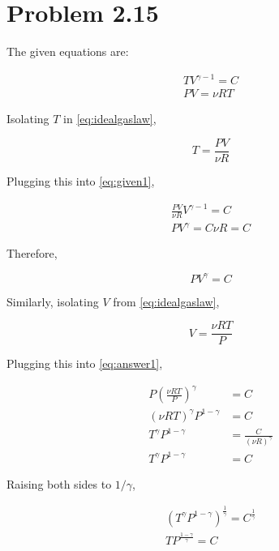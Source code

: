 \documentclass[12pt,a4paper]{article}
\begin{document}
\setcounter{page}{1}

\section*{Problem 2.15}
\bigskip

The given equations are:

\begin{eqnarray}
	TV^{\gamma-1} = C \label{eq:given1} \\
	PV = \nu RT \label{eq:idealgaslaw}
\end{eqnarray}

Isolating $T$ in \eqref{eq:idealgaslaw},

\begin{equation}
	T = \frac{PV}{\nu R} \label{eq:idealgastemp}
\end{equation}

Plugging this into \eqref{eq:given1},

\begin{align}
	\frac{PV}{\nu R} V^{\gamma - 1} = C \nonumber \\
	PV^{\gamma} = C\nu R = C
\end{align}

Therefore,

\begin{equation}\label{eq:answer1}
\boxed{	PV^\gamma = C	}
\end{equation}

Similarly, isolating $V$ from \eqref{eq:idealgaslaw},

\begin{equation}\label{eq:idealgasvol}
	V = \frac{\nu RT}{P}
\end{equation}

Plugging this into \eqref{eq:answer1},

\begin{align}
	P\left( \frac{\nu RT}{P} \right)^\gamma & = C \nonumber \\
	\left( \nu RT \right)^\gamma P^{1-\gamma} & = C \nonumber \\
	T^\gamma P^{1-\gamma} & = \frac{C}{\left( \nu R \right)^\gamma} \nonumber \\
	T^\gamma P^{1-\gamma} & = C
\end{align}

Raising both sides to $1/\gamma$,

\begin{eqnarray}
	\left( T^\gamma P^{1-\gamma} \right)^{\frac{1}{\gamma}} = C^{\frac{1}{\gamma}} \nonumber \\
\boxed{	TP^{\frac{1 - \gamma}{\gamma}} = C} \label{eq:answer2}
\end{eqnarray}
\end{document}

